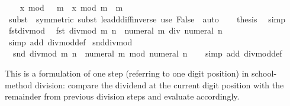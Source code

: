 \begin{isabellebody}
\ \ \isamarkupfalse%
\ {\isachardoublequoteopen}x\ mod\ {\isacharparenleft}{\kern0pt}{}\ {\isacharasterisk}{\kern0pt}\ m{\isacharparenright}{\kern0pt}\ {\isacharequal}{\kern0pt}\ x\ mod\ m\ {\isacharplus}{\kern0pt}\ m{\isachardoublequoteclose}\isanewline
\ \ \ \ \isamarkupfalse%
\ {\isacharparenleft}{\kern0pt}subst\ {\isacharasterisk}{\kern0pt}\ {\isacharbrackleft}{\kern0pt}symmetric{\isacharbrackright}{\kern0pt}{\isacharcomma}{\kern0pt}\ subst\ le{\isacharunderscore}{\kern0pt}add{\isacharunderscore}{\kern0pt}diff{\isacharunderscore}{\kern0pt}inverse{}{\isacharparenright}{\kern0pt}\ {\isacharparenleft}{\kern0pt}use\ False\ \ auto{\isacharparenright}{\kern0pt}\isanewline
\ \ \isamarkupfalse%
\ {\isacharquery}{\kern0pt}thesis\ \isamarkupfalse%
\ simp\isanewline
{}\isamarkupfalse%
%
\endisatagproof
{\isafoldproof}%
%
\isadelimproof
\isanewline
%
\endisadelimproof
\isanewline
{}\isamarkupfalse%
\ fst{\isacharunderscore}{\kern0pt}divmod{\isacharcolon}{\kern0pt}\isanewline
\ \ {\isachardoublequoteopen}fst\ {\isacharparenleft}{\kern0pt}divmod\ m\ n{\isacharparenright}{\kern0pt}\ {\isacharequal}{\kern0pt}\ numeral\ m\ div\ numeral\ n{\isachardoublequoteclose}\isanewline
%
\isadelimproof
\ \ %
\endisadelimproof
%
\isatagproof
{}\isamarkupfalse%
\ {\isacharparenleft}{\kern0pt}simp\ add{\isacharcolon}{\kern0pt}\ divmod{\isacharunderscore}{\kern0pt}def{\isacharparenright}{\kern0pt}%
\endisatagproof
{\isafoldproof}%
%
\isadelimproof
\isanewline
%
\endisadelimproof
\isanewline
{}\isamarkupfalse%
\ snd{\isacharunderscore}{\kern0pt}divmod{\isacharcolon}{\kern0pt}\isanewline
\ \ {\isachardoublequoteopen}snd\ {\isacharparenleft}{\kern0pt}divmod\ m\ n{\isacharparenright}{\kern0pt}\ {\isacharequal}{\kern0pt}\ numeral\ m\ mod\ numeral\ n{\isachardoublequoteclose}\isanewline
%
\isadelimproof
\ \ %
\endisadelimproof
%
\isatagproof
{}\isamarkupfalse%
\ {\isacharparenleft}{\kern0pt}simp\ add{\isacharcolon}{\kern0pt}\ divmod{\isacharunderscore}{\kern0pt}def{\isacharparenright}{\kern0pt}%
\endisatagproof
{\isafoldproof}%
%
\isadelimproof
%
\endisadelimproof
%
\begin{isamarkuptext}%
This is a formulation of one step (referring to one digit position)
  in school-method division: compare the dividend at the current
  digit position with the remainder from previous division steps
  and evaluate accordingly.%
\end{isamarkuptext}\isamarkuptrue%

\end{isabellebody}
